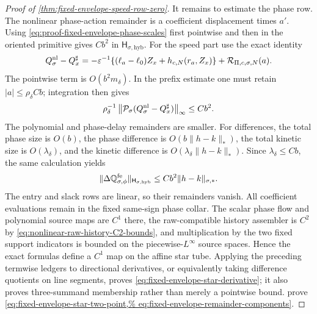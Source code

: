 \begin{proof}[Proof of
\cref{thm:fixed-envelope-speed-row-zero}]
It remains to estimate the phase row.  The nonlinear phase-action
remainder is a coefficient displacement times \(a'\).  Using
\cref{eq:proof-fixed-envelope-phase-scales} first pointwise and then in
the oriented primitive gives \(Cb^2\) in
\(\mathsf H_{\sigma,\mathrm{hyb}}\).  For the speed part use the exact
identity
\begin{equation}
 Q_\sigma^{\rm nl}-Q_x^\sharp
 =-\varepsilon^{-1}
   \{(\ell_a-\ell_0)Z_x+h_{c,N}(r_a,Z_x)\}
       +\mathcal R_{\Pi,c,\sigma,N}(a).           \label{eq:proof-fixed-envelope-speed-exact-cancellation}
\end{equation}
The pointwise term is \(O(b^2m_\delta)\).  In the prefix estimate one
must retain \(|a|\le\rho_\delta Cb\); integration then gives
\[
 \rho_\delta^{-1}
 \left\|\mathcal P_\sigma
       (Q_\sigma^{\rm nl}-Q_x^\sharp)\right\|_\infty
 \le Cb^2.
\]
The polynomial and phase-delay remainders are smaller.  For differences,
the total phase size is \(O(b)\), the phase difference is
\(O(b\|h-k\|_*)\), the total kinetic size is \(O(\lambda_\delta)\), and
the kinetic difference is
\(O(\lambda_\delta\|h-k\|_*)\).  Since
\(\lambda_\delta\le Cb\), the same calculation yields
\begin{equation}
 \|\Delta\mathbb Q_{\sigma,\phi}^{\rm fe}\|_
       {\mathsf H_{\sigma,\mathrm{hyb}}}
 \le Cb^2\|h-k\|_{\sigma,*}.                     \label{eq:proof-fixed-envelope-phase-remainder}
\end{equation}
The entry and slack rows are linear, so their remainders vanish.
All coefficient evaluations remain in the fixed same-sign phase collar.
The scalar phase flow and polynomial source maps are \(C^1\) there, the
raw-compatible history assembler is \(C^2\) by
\cref{eq:nonlinear-raw-history-C2-bounds}, and multiplication by the two
fixed support indicators is bounded on the piecewise-\(L^\infty\) source
spaces.  Hence the exact formulas define a \(C^1\) map on the affine star
tube.  Applying the preceding termwise ledgers to directional
derivatives, or equivalently taking difference quotients on line segments,
proves \cref{eq:fixed-envelope-star-derivative}; it also proves
three-summand membership rather than merely a pointwise bound.
prove
\cref{eq:fixed-envelope-star-two-point,%
eq:fixed-envelope-remainder-components}.


\end{proof}
